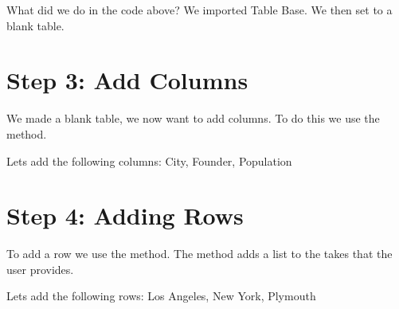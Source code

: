 \documentclass[letterpaper,10pt,english]{sphinxmanual}
\begin{document}
%
\begin{sphinxVerbatim}[commandchars=\\\{\}]
 

  
\end{sphinxVerbatim}
\sphinxresetverbatimhllines

What did we do in the code above? We imported Table Base. We then set
 to a blank table.


\section{Step 3: Add Columns}
\label{\detokenize{basictutorial:step-3-add-columns}}
We made a blank table, we now want to add columns. To do this we use the
 method.

Lets add the following columns: City, Founder, Population

%
\begin{sphinxVerbatim}[commandchars=\\\{\}]
 

  

\end{sphinxVerbatim}
\sphinxresetverbatimhllines


\section{Step 4: Adding Rows}
\label{\detokenize{basictutorial:step-4-adding-rows}}
To add a row we use the  method. The  method adds a
list to the takes that the user provides.

Lets add the following rows: Los Angeles, New York, Plymouth
\end{document}
